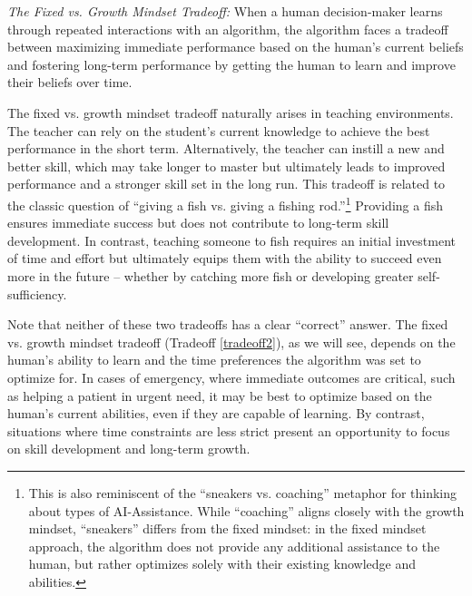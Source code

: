 \begin{tradeoff} \label{tradeoff2}
     {\em The Fixed vs. Growth Mindset Tradeoff:} 
     When a human decision-maker learns through repeated interactions with an algorithm, the algorithm faces a tradeoff between %
     maximizing immediate performance 
     based on the human's current beliefs and %
     fostering long-term performance 
     by {getting} %
     the human to learn and improve their beliefs over time.
\end{tradeoff}


The fixed vs. growth mindset tradeoff naturally arises in teaching environments. The teacher can rely on the student's current knowledge to achieve the best performance in the short term. Alternatively, the teacher can instill a new and better skill, which may take longer to master but ultimately leads to improved performance and a stronger skill set in the long run.
%
This tradeoff is related to the classic question of ``giving a fish vs. giving a fishing rod.''\footnote{This is also {reminiscent} of the ``sneakers vs. coaching'' metaphor \cite{hofman2023a} for thinking about types of AI-Assistance. While ``coaching'' aligns closely with the growth mindset, ``sneakers'' differs from the fixed mindset: in the fixed {mindset} approach, the algorithm does not provide any additional assistance to the human, but rather optimizes solely with their existing knowledge and abilities.}  Providing a fish ensures immediate success but does not contribute to long-term skill development. In contrast, teaching someone to fish requires an initial investment of time and effort but ultimately equips them with the ability to succeed even more in the future -- whether by catching more fish or developing greater self-sufficiency. 



Note that neither of these two tradeoffs has a clear ``correct'' answer. The fixed vs. growth mindset tradeoff (Tradeoff \ref{tradeoff2}), as we will see, depends on the human's ability to learn and the time preferences the algorithm was set to optimize for. In cases of emergency, where immediate outcomes are critical, such as helping a patient in urgent need, it may be best to optimize based on the human's current abilities, even if they are capable of learning. By contrast, situations where time constraints are less strict present an opportunity to focus on skill development and long-term growth. 
%

